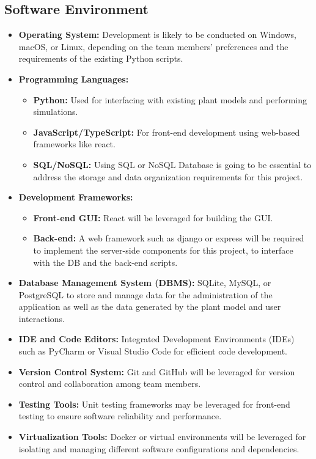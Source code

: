 \documentclass{article}
\begin{document}
\subsection*{Software Environment}
\begin{itemize}
    \item \textbf{Operating System:} Development is likely to be conducted on Windows, macOS, or Linux, depending on the team members' preferences and the requirements of the existing Python scripts.
    \item \textbf{Programming Languages:} 
    \begin{itemize}
        \item \textbf{Python:} Used for interfacing with existing plant models and performing simulations.
        \item \textbf{JavaScript/TypeScript:} For front-end development using web-based frameworks like react.
        \item \textbf{SQL/NoSQL:} Using SQL or NoSQL Database is going to be essential to address the storage and data organization requirements for this project.
    \end{itemize}
    \item \textbf{Development Frameworks:}
    \begin{itemize}
        \item \textbf{Front-end GUI:} React will be leveraged for building the GUI.
        \item \textbf{Back-end:} A web framework such as django or express will be required to implement the server-side components for this project, to interface with the DB and the back-end scripts.
    \end{itemize}
    \item \textbf{Database Management System (DBMS):} SQLite, MySQL, or PostgreSQL to store and manage data for the administration of the application as well as the data generated by the plant model and user interactions.
    \item \textbf{IDE and Code Editors:} Integrated Development Environments (IDEs) such as PyCharm or Visual Studio Code for efficient code development.
    \item \textbf{Version Control System:} Git and GitHub will be leveraged for version control and collaboration among team members.
    \item \textbf{Testing Tools:} Unit testing frameworks may be leveraged for front-end testing to ensure software reliability and performance.
    \item \textbf{Virtualization Tools:} Docker or virtual environments will be leveraged for isolating and managing different software configurations and dependencies.
\end{itemize}
\end{document}
